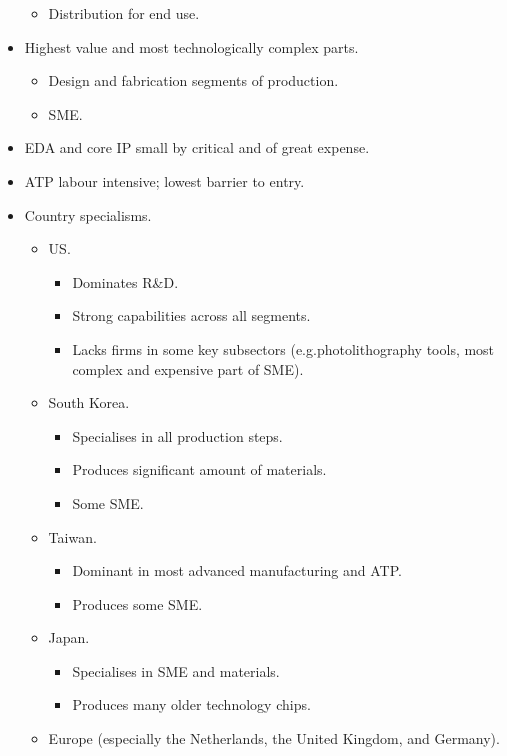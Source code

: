 \begin{itemize}
\begin{itemize}
        \item Distribution for end use.
    \end{itemize}
    \item Highest value and most technologically complex parts.
    \begin{itemize}
        \item Design and fabrication segments of production.
        \item SME.
    \end{itemize}
    \item EDA and core IP small by critical and of great expense.
    \item ATP labour intensive; lowest barrier to entry.
    \item Country specialisms.
    \begin{itemize}
        \item US.
        \begin{itemize}
            \item Dominates R\&D.
            \item Strong capabilities across all segments.
            \item Lacks firms in some key subsectors (e.g.\@ photolithography tools, most complex and expensive part of SME).
        \end{itemize}
        \item South Korea.
        \begin{itemize}
            \item Specialises in all production steps.
            \item Produces significant amount of materials.
            \item Some SME.
        \end{itemize}
        \item Taiwan.
        \begin{itemize}
            \item Dominant in most advanced manufacturing and ATP.
            \item Produces some SME.
        \end{itemize}
        \item Japan.
        \begin{itemize}
            \item Specialises in SME and materials.
            \item Produces many older technology chips.
        \end{itemize}
        \item Europe (especially the Netherlands, the United Kingdom, and Germany).

\end{itemize}
\end{itemize}
